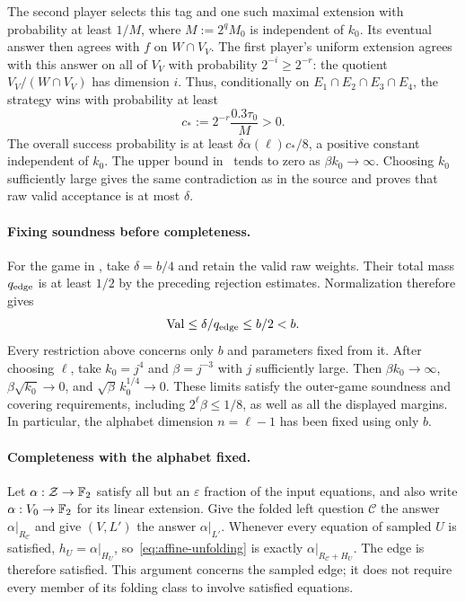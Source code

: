 The second player selects this tag and one such maximal extension
with probability at least $1/M$, where
$M:=2^qM_0$ is independent of $k_0$.
Its eventual answer then agrees with $f$ on $W\cap V_V$.
The first player's uniform extension agrees with this
answer on all of $V_V$ with probability $2^{-i}\ge2^{-r}$:
the quotient $V_V/(W\cap V_V)$ has dimension $i$.
Thus, conditionally on $E_1\cap E_2\cap E_3\cap E_4$, the strategy
wins with probability at least
\[
 c_*:=2^{-r}\frac{0.3\tau_0}{M}>0.
\]
The overall success probability is at least
$\delta\alpha(\ell)c_*/8$, a positive constant independent of $k_0$.
The upper bound in~\cite[Lemma~5.4]{DKKMS25} tends to zero as
$\beta k_0\to\infty$.  Choosing $k_0$ sufficiently large gives the
same contradiction as in the source and proves that raw valid
acceptance is at most $\delta$.

\paragraph{Fixing soundness before completeness.}
For the game in , take $\delta=b/4$ and retain
the valid raw weights.  Their total mass $q_{\rm edge}$ is at least
$1/2$ by the preceding rejection estimates.  Normalization therefore
gives
\[
  \operatorname{Val}\le\delta/q_{\rm edge}\le b/2<b.
\]
Every restriction above concerns only $b$ and parameters fixed from it.
After choosing $\ell$, take $k_0=j^4$ and $\beta=j^{-3}$ with $j$
sufficiently large.  Then $\beta k_0\to\infty$,
$\beta\sqrt{k_0}\to0$, and $\sqrt\beta\,k_0^{1/4}\to0$.
These limits satisfy the outer-game soundness and covering requirements,
including $2^\ell\beta\le1/8$, as well as all the displayed margins.
In particular, the alphabet dimension $n=\ell-1$ has been fixed using
only $b$.

\paragraph{Completeness with the alphabet fixed.}
Let $\alpha:\mathcal Z\to\mathbb F_2$ satisfy all but an $\varepsilon$ fraction of
the input equations, and also write $\alpha:V_0\to\mathbb F_2$ for its linear
extension.  Give the folded left question $\mathcal C$ the answer
$\alpha|_{R_{\mathcal C}}$ and give $(V,L')$ the answer $\alpha|_{L'}$.
Whenever every equation of sampled $U$ is satisfied,
$h_U=\alpha|_{H_U}$, so~\eqref{eq:affine-unfolding} is exactly
$\alpha|_{R_{\mathcal C}+H_U}$.  The edge is therefore satisfied.
This argument concerns the sampled edge; it does not require every
member of its folding class to involve satisfied equations.

